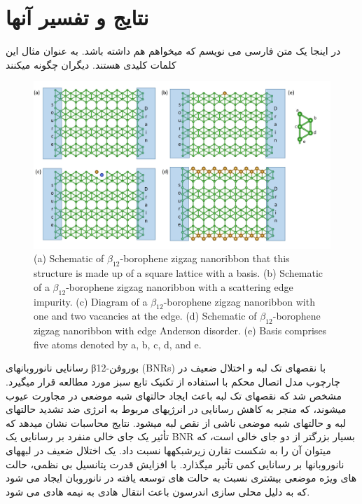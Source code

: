 \chapter{نتایج و تفسیر آنها}
\clearpage
در اینجا یک متن فارسی می نویسم که میخواهم  هم داشته باشد.
به عنوان مثال این  کلمات کلیدی هستند.
دیگران چگونه  میکنند

\begin{figure}[!ht]
    \centering
      \includegraphics[width=1\linewidth]{./figures/borophene_structure(3).JPG}
      \caption{(a) Schematic of $\beta_{12}$-borophene zigzag nanoribbon that this structure is made up of a square lattice with a basis. 
      (b) Schematic of a $\beta_{12}$-borophene zigzag nanoribbon with a scattering edge impurity. 
      (c) Diagram of a $\beta_{12}$-borophene zigzag nanoribbon with one and two vacancies at the edge. 
      (d) Schematic of $\beta_{12}$-borophene zigzag nanoribbon with edge Anderson disorder. 
      (e) Basis comprises five atoms denoted by a, b, c, d, and e.}
     \label{borophene}
    \end{figure}
رسانایی نانوروبانهای β12-بوروفن (BNRs) با نقصهای تک لبه و اختلال ضعیف در چارچوب مدل اتصال محکم با استفاده از تکنیک تابع سبز مورد مطالعه قرار میگیرد. مشخص شد که نقصهای تک لبه باعث ایجاد حالتهای شبه موضعی در مجاورت عیوب میشوند، که منجر به کاهش رسانایی در انرژیهای مربوط به انرژی ضد تشدید حالتهای لبه و حالتهای شبه موضعی ناشی از نقص لبه میشود. نتایج محاسبات نشان میدهد که تأثیر یک جای خالی منفرد بر رسانایی یک BNR بسیار بزرگتر از دو جای خالی است، که میتوان آن را به شکست تقارن زیرشبکهها نسبت داد. یک اختلال ضعیف در لبههای نانوروبانها بر رسانایی کمی تأثیر میگذارد. با افزایش قدرت پتانسیل بی نظمی، حالت های ویژه موضعی بیشتری نسبت به حالت های توسعه یافته در نانوروبان ایجاد می شود که به دلیل محلی سازی اندرسون باعث انتقال هادی به نیمه هادی می شود.
